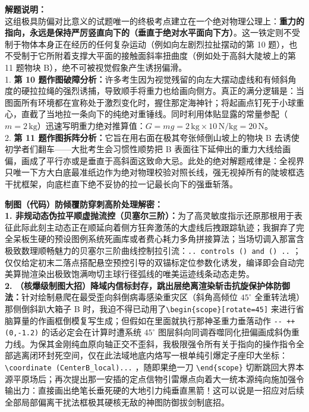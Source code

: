 {\small\color{gray}
\textbf{解题说明：}\\
这组极具防偏对比意义的试题唯一的终极考点建立在一个绝对物理公理上：\textbf{重力的指向，永远是保持严厉竖直向下的（垂直于绝对水平面向下方）}。这一铁定则不受制于物体本身正在经历的任何复杂运动（例如向左剧烈拉扯摆动的第 10 题），也不受制于它所附着支撑大平面的接触面斜率扭曲度（例如处于高斜大陡坡上的第 11 题物块 B），绝不可被视觉假象产生诱拐偏滑。\\
1. \textbf{第 10 题作图破障分析：}许多考生因为视觉残留的向左大摆动虚线和有倾斜角度的硬拉拉绳的强烈诱捕，导致顺手将重力也给画向侧方。真正的满分逻辑是：当图面所有环境都在宣称处于激烈变化时，握住那定海神针；将起画点钉死于小球重心，直截了当地拉一条向下的纯绝对重锤线。同时利用体贴显露的常量参配（$m=2\,\text{kg}$）迅速写明重力绝对推算值：$G = mg = 2\,\text{kg} \times 10\,\text{N/kg} = 20\,\text{N}$。\\
2. \textbf{第 11 题作图拆阵分析：}它旨在用右面在极其夸张倾倒山坡上的物块 B 去诱使初学者们翻车——大批考生会习惯性顺势把 B 表面往下延伸出的重力大线给画偏，画成了平行亦或是垂直于高斜面这致命大忌。此处的绝对解题戒律是：全视界只唯一下方大白底最准纸边作为绝对物理校验对照长线，强无视掉所有的陡坡框选干扰框架，向底栏直下绝不妥协的拉一记最长向下的强垂斩落。
}

\vspace{0.6cm}

{\small\color{blue!70!black}
\textbf{制图（代码）防倾覆防穿刺高阶处理解密：}\\
\textbf{1. 非规动态伪拉平顺虚抛流控（贝塞尔三阶）：}为了高灵敏度指示还原那根用于表征此际此刻主动态正在顺延向着侧方狂奔激荡的大虚线后拽跟踪轨迹；我摒弃了完全呆板生硬的预设图例系统死画库或者费心耗力多角拼接算法；当场切调入那富含极致数理顺畅魅力的贝塞尔三阶曲线控制拉引流：\texttt{.. controls () and () ..} ；仅仅给定初末二落点搭配悬空预控引导的双锚标定位参数化诱发，编译即会自动完美算抛渲染出极致饱满吻切主球行径弧线的唯美运迹线条动态走势。\\
\textbf{2. （核爆级制图大招）降域内信标封存，跳出层绝离渲染斩击抗旋保护体防御法：}针对绘制悬爬在最受歪向斜倒病毒感染重灾区（斜角高倾位 $45^\circ$ 全重转法境）那侧倒斜趴大箱子 B 时，我迫不得已动用了\texttt{\textbackslash begin\{scope\}[rotate=45]} 来进行省脑算量的作画框倒模复写生成；但假如在里面就执行那神圣重力垂落动作 \texttt{-{}- ++(0,-1.2)} 的话必定会在计算时遭系统 $45^\circ$ 图层斜向同调吞噬同化扭偏画成斜伪重力线。为保其金刚纯血原向轴正交不歪斜，我极限强令所有关于指向的操作指令全部逃离闭环封死空间，仅在此法域地底内烙写一根单纯引爆定子座印大坐标：\texttt{\textbackslash coordinate (CenterB\_local)...} ，随即果绝一刀 \texttt{\textbackslash end\{scope\}} 切断跳回大界本源平原场后；再次提出那一安插的定点信物引雷爆点向着大一统本源纯向施加强令输出力：直接画出绝笔长垂死硬的大地引力纯垂直黑箭！这可以说是一招应对后续全部局部偏离干扰法框极其硬核无敌的神图防御拔剑制底招。
}

